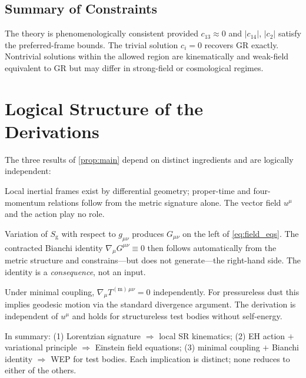 \documentclass[12pt,a4paper]{article}
\newcommand{\EH}{S_{\mathrm{g}}}
\begin{document}
\subsection{Summary of Constraints}

The theory is phenomenologically consistent provided $c_{13}\approx 0$ and
$|c_{14}|$, $|c_{2}|$ satisfy the preferred-frame bounds. The trivial solution
$c_{i}=0$ recovers GR exactly. Nontrivial solutions within the allowed region
are kinematically and weak-field equivalent to GR but may differ in strong-field
or cosmological regimes.

\section{Logical Structure of the Derivations}
\label{sec:logic}


The three results of \cref{prop:main} depend on distinct ingredients and are
logically independent:

\begin{description}[leftmargin=2em, labelsep=1em]
  \item[SR kinematics $\Leftarrow$ Lorentzian signature.]
    Local inertial frames exist by differential geometry; proper-time and
    four-momentum relations follow from the metric signature alone. The vector
    field $u^{\mu}$ and the action play no role.

  \item[Einstein field equations $\Leftarrow$ EH action $+$ variational principle.]
    Variation of $\EH$ with respect to $g_{\mu\nu}$ produces $G_{\mu\nu}$ on
    the left of \cref{eq:field_eqs}. The contracted Bianchi identity
    $\nabla_{\!\mu}G^{\mu\nu}\equiv 0$ then follows automatically from the
    metric structure and constrains---but does not generate---the right-hand
    side. The identity is a \emph{consequence}, not an input.

  \item[WEP for test bodies $\Leftarrow$ minimal coupling $+$ Bianchi identity.]
    Under minimal coupling, $\nabla_{\!\mu}T^{(\mathrm{m})\,\mu\nu}=0$
    independently. For pressureless dust this implies geodesic motion via the
    standard divergence argument. The derivation is independent of $u^{\mu}$
    and holds for structureless test bodies without self-energy.
\end{description}

In summary: (1) Lorentzian signature $\Rightarrow$ local SR kinematics;
(2) EH action $+$ variational principle $\Rightarrow$ Einstein field equations;
(3) minimal coupling $+$ Bianchi identity $\Rightarrow$ WEP for test bodies.
Each implication is distinct; none reduces to either of the others.
\end{document}
